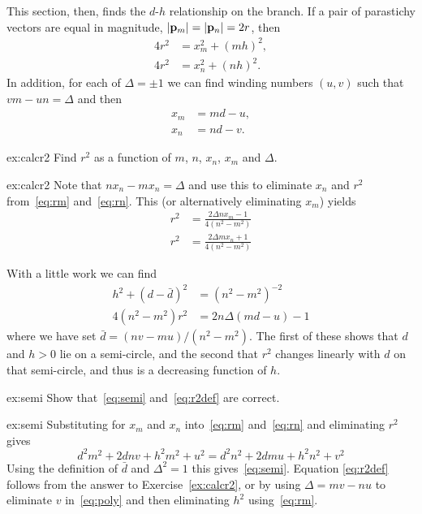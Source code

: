 This section, then, finds the $d$-$h$ relationship on the   branch.
If a pair of parastichy vectors are  equal in magnitude, $\left|{\mathbf p}_{m}\right|=\left|{\mathbf p}_{n}\right|=2r$, then 
\begin{align}
 	\label{eq:rm}
4 r^2&=x_m^2 + (mh)^2,\\
\label{eq:rn}
4 r^2&= x_n^2 + (nh)^2.
\end{align}
In addition, for each of $\Delta=\pm1$ we can find winding numbers $(u,v)$ such that $vm-un=\Delta$ 
and then
 \begin{align}
  x_m&=md-u,\\ 
  x_n&=nd-v. 
  \end{align}
\begin{jExercise}{ex:calcr2}
	Find $r^2$ as a function of $m$, $n$, $x_n$, $x_m$ and $\Delta$.
\end{jExercise}
\begin{jAnswer}{ex:calcr2}
	Note that $n x_n - m x_n=\Delta$ and use this to eliminate $x_n$ and $r^2$ from~\eqref{eq:rm} and~\eqref{eq:rn}.
	This (or alternatively eliminating $x_m$) yields
	\begin{align}
	r^2		&= \frac{2 \Delta n x_m -1}{4(n^2-m^2)} \label{ex:r2xm}
		\\
		r^2		&=  \frac{2 \Delta m x_n + 1}{4(n^2-m^2)} \label{ex:r2xn}
	\end{align}

\end{jAnswer}
With a little work we can find
 \begin{align}
h^2  +  (d-\bar d)^2 
 &= (n^2-m^2)^{-2} \label{eq:semi}
\\
\label{eq:r2def}
4  (n^2-m^2) r^2 &= 2  n \Delta ( m d - u)-1
\end{align}
where we have set  $\bar d= {(nv-mu)}/{(n^2-m^2)}$. The first of these shows that $d$ and $h>0$ lie on a semi-circle, and the second that $r^2$ changes linearly with $d$ on that semi-circle, and thus is a decreasing function of $h$.
\begin{jExercise}{ex:semi}
	Show that~\eqref{eq:semi} and~\eqref{eq:r2def} are correct.
\end{jExercise} 
\begin{jAnswer}{ex:semi}
Substituting for $x_m$ and $x_n$ into~\eqref{eq:rm} and~\eqref{eq:rn} and eliminating $r^2$ gives
\begin{equation}
	\label{eq:poly}
d^2 m^2+2 d n v+h^2 m^2+u^2=d^2 n^2+2 d m u+h^2 n^2+v^2
\end{equation}
Using the definition of $\bar{d}$ and $\Delta^2=1$ this gives~\eqref{eq:semi}. 
Equation \eqref{eq:r2def} follows from the answer to Exercise~\ref{ex:calcr2}, or by 
 using $\Delta=mv-nu$ to eliminate $v$ in~\eqref{eq:poly} and then eliminating $h^2$ using~\eqref{eq:rm}.

\end{jAnswer}



